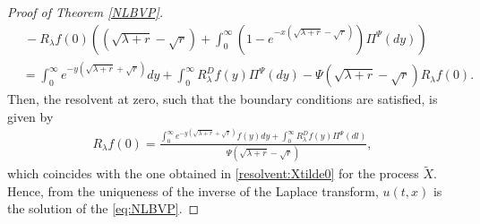 \documentclass[11pt,a4paper]{article}
\theoremstyle{definition}
\theoremstyle{remark}
\begin{document}
\begin{proof}[Proof of Theorem \ref{NLBVP}]
\begin{align*}
		&\, - R_\lambda f(0) \left((\sqrt{\lambda+ r} - \sqrt{r}) + \int_{0}^\infty (1- e^{-x(\sqrt{\lambda+ r} - \sqrt{r})}) \Pi^\Psi(dy) \right)\\
		&=\int_0^\infty e^{-y(\sqrt{\lambda + r} + \sqrt{r})} dy + \int_0^\infty R_\lambda^D f(y) \Pi^\Psi(dy) - \Psi(\sqrt{\lambda+ r} - \sqrt{r})R_\lambda f(0).
	\end{align*}
	Then, the resolvent at zero, such that the boundary conditions are satisfied, is given by
	\begin{align*}
		R_\lambda f(0)=\frac{\int_0^\infty e^{-y(\sqrt{\lambda + r} + \sqrt{r})} f(y) dy + \int_0^\infty {R}_\lambda^D f(y) \Pi^\Psi(dl)}{\Psi(\sqrt{\lambda + r} - \sqrt{r})},
	\end{align*}
	which coincides with the one obtained in \eqref{resolvent:Xtilde0} for the process $\widetilde{X}$. Hence, from the uniqueness of the inverse of the Laplace transform, $u(t,x)$ is the solution of the \eqref{eq:NLBVP}.
\end{proof}
\end{document}
